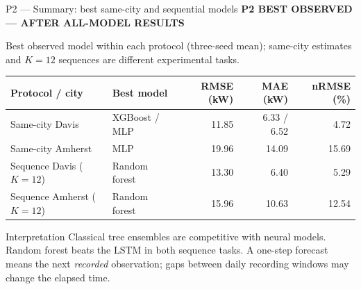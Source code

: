 \documentclass[aspectratio=169,11pt]{beamer}
\newcommand{\sectiontag}[1]{{\footnotesize\usebeamercolor[fg]{structure}\textbf{#1}}\par\vspace{0.10cm}}
\newcommand{\smallmuted}[1]{{\footnotesize\color{slate}#1\par}}
\begin{document}
\begin{frame}{P2 — Summary: best same-city and sequential models}
\sectiontag{P2 \quad BEST OBSERVED — AFTER ALL-MODEL RESULTS}
\smallmuted{Best observed model within each protocol (three-seed mean); same-city estimates and $K=12$ sequences are different experimental tasks.}
\vspace{0.18cm}
{\small\renewcommand{\arraystretch}{1.35}
\setlength{\tabcolsep}{5pt}
\begin{tabular}{@{}llrrr@{}}\toprule
\textbf{Protocol / city} & \textbf{Best model} & \textbf{RMSE (kW)} & \textbf{MAE (kW)} & \textbf{nRMSE (\%)}\\\midrule
Same-city Davis & XGBoost / MLP & 11.85 & 6.33 / 6.52 & 4.72\\
Same-city Amherst & MLP & 19.96 & 14.09 & 15.69\\\midrule
Sequence Davis ($K=12$) & Random forest & 13.30 & 6.40 & 5.29\\
Sequence Amherst ($K=12$) & Random forest & 15.96 & 10.63 & 12.54\\
\bottomrule\end{tabular}}
\vspace{0.12cm}
\begin{block}{Interpretation}
\footnotesize Classical tree ensembles are competitive with neural models. Random forest beats the LSTM in both sequence tasks. A one-step forecast means the next \emph{recorded} observation; gaps between daily recording windows may change the elapsed time.
\end{block}
\end{frame}
\end{document}
